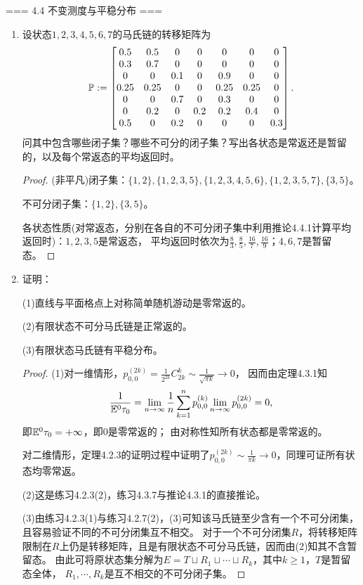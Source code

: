 === 4.4 不变测度与平稳分布 ===
\begin{enumerate}
    \item[4.4.5] 设状态$1,2,3,4,5,6,7$的马氏链的转移矩阵为
    \[\P:=\begin{bmatrix}0.5&0.5&0&0&0&0&0\\
    0.3&0.7&0&0&0&0&0\\
    0&0&0.1&0&0.9&0&0\\
    0.25&0.25&0&0&0.25&0.25&0\\
    0&0&0.7&0&0.3&0&0\\
    0&0.2&0&0.2&0.2&0.4&0\\
    0.5&0&0.2&0&0&0&0.3\end{bmatrix}.\]
    问其中包含哪些闭子集？哪些不可分的闭子集？写出各状态是常返还是暂留的，以及每个常返态的平均返回时。
    \begin{proof}
        (非平凡)闭子集：$\{1,2\},\{1,2,3,5\},\{1,2,3,4,5,6\},\{1,2,3,5,7\},\{3,5\}$。

        不可分闭子集：$\{1,2\},\{3,5\}$。

        各状态性质(对常返态，分别在各自的不可分闭子集中利用推论4.4.1计算平均返回时)：$1,2,3,5$是常返态，
        平均返回时依次为$\frac{8}{3},\frac{8}{5},\frac{16}{7},\frac{16}{9}$；$4,6,7$是暂留态。
    \end{proof}
    \item[4.4.6] 证明：

    (1)直线与平面格点上对称简单随机游动是零常返的。

    (2)有限状态不可分马氏链是正常返的。

    (3)有限状态马氏链有平稳分布。
    \begin{proof}
        (1)对一维情形，$p_{0,0}^{(2k)}=\frac{1}{2^{2k}}C_{2k}^k\sim\frac{1}{\sqrt{\pi k}}\to0$，
        因而由定理4.3.1知\[\frac{1}{\E^0\tau_0}=\lim_{n\to\infty}\frac{1}{n}\sum_{k=1}^np_{0,0}^{(k)}
        \lim_{n\to\infty}p_{0,0}^{(2k)}=0,\]即$\E^0\tau_0=+\infty$，即$0$是零常返的；
        由对称性知所有状态都是零常返的。

        对二维情形，定理4.2.3的证明过程中证明了$p_{0,0}^{(2k)}\sim\frac{1}{\pi k}\to0$，同理可证所有状态均零常返。

        (2)这是练习4.2.3(2)，练习4.3.7与推论4.3.1的直接推论。

        (3)由练习4.2.3(1)与练习4.2.7(2)，(3)可知该马氏链至少含有一个不可分闭集，且容易验证不同的不可分闭集互不相交。
        对于一个不可分闭集$R$，将转移矩阵限制在$R$上仍是转移矩阵，且是有限状态不可分马氏链，因而由(2)知其不含暂留态。
        由此可将原状态集分解为$E=T\sqcup R_1\sqcup\cdots\sqcup R_k$，其中$k\geqslant1$，$T$是暂留态全体，
        $R_1,\cdots,R_k$是互不相交的不可分闭子集。
        

\end{proof}
\end{enumerate}
